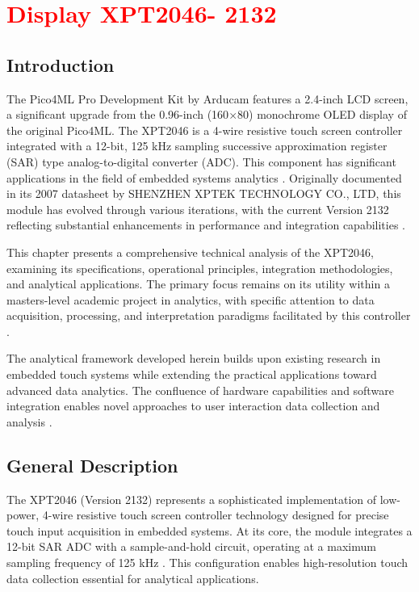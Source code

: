 %
%



\chapter{\textcolor{red}{Display XPT2046- 2132}}





\section{Introduction}
The Pico4ML Pro Development Kit by Arducam features a 2.4-inch LCD screen, a significant upgrade from the 0.96-inch (160$\times$80) monochrome OLED display of the original Pico4ML. The XPT2046 is a 4-wire resistive touch screen controller integrated with a 12-bit, 125 kHz sampling successive approximation register (SAR) type analog-to-digital converter (ADC). This component has significant applications in the field of embedded systems analytics \cite{ xpt2046:2007}. Originally documented in its 2007 datasheet by SHENZHEN XPTEK TECHNOLOGY CO., LTD, this module has evolved through various iterations, with the current Version 2132 reflecting substantial enhancements in performance and integration capabilities \cite{Waveshare:2024}.

This chapter presents a comprehensive technical analysis of the XPT2046, examining its specifications, operational principles, integration methodologies, and analytical applications. The primary focus remains on its utility within a masters-level academic project in analytics, with specific attention to data acquisition, processing, and interpretation paradigms facilitated by this controller \cite{ESPHome:2024}.

The analytical framework developed herein builds upon existing research in embedded touch systems while extending the practical applications toward advanced data analytics. The confluence of hardware capabilities and software integration enables novel approaches to user interaction data collection and analysis \cite{Stoffregen:2023}.

\section{General Description}
The XPT2046 (Version 2132) represents a sophisticated implementation of low-power, 4-wire resistive touch screen controller technology designed for precise touch input acquisition in embedded systems. At its core, the module integrates a 12-bit SAR ADC with a sample-and-hold circuit, operating at a maximum sampling frequency of 125 kHz \cite{ xpt2046:2007}. This configuration enables high-resolution touch data collection essential for analytical applications.

